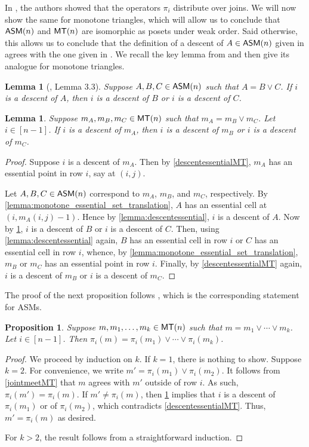\documentclass[12 pt]{amsart}
\newtheorem{proposition}[Theorem]{Proposition}
\newtheorem{lemma}[Theorem]{Lemma}
\numberwithin{equation}{section}
\theoremstyle{remark}
\newcommand{\asm}{{\sf ASM}}
\newcommand{\monotone}{{\sf MT}}
\begin{document}
In \cite{EKW-main}, the authors showed that the operators $\pi_i$ distribute over joins. We will now show the same for monotone triangles, which will allow us to conclude that $\asm(n)$ and $\monotone(n)$ are isomorphic as posets under weak order. Said otherwise, this allows us to conclude that the definition of a descent of $A \in \asm(n)$ given in \cite{EKW-main} agrees with the one given in \cite{HR20}. We recall the key lemma from \cite{EKW-main} and then give its analogue for monotone triangles.

\begin{lemma}[\cite{EKW-main}, Lemma 3.3]
\label{lemma:joindescent}
    Suppose $A,B,C\in \asm(n)$ such that $A=B\vee C$.  If $i$ is a descent of $A$, then $i$ is a descent of $B$ or $i$ is a descent of $C$.  
\end{lemma}

\begin{lemma}
\label{lemma:joindescentMT}
    Suppose $m_A,m_B,m_C\in \monotone(n)$ such that $m_A=m_B\vee m_C$.  Let $i \in [n-1]$. If $i$ is a descent of $m_A$, then $i$ is a descent of $m_B$ or $i$ is a descent of $m_C$.  
\end{lemma}
\begin{proof}
  Suppose $i$ is a descent of $m_A$.  Then by \cref{descentessentialMT}, $m_A$ has an essential point in row $i$, say at $(i,j)$. 
  
  Let $A, B, C \in \asm(n)$ correspond to $m_A$, $m_B$, and $m_C$, respectively. By \cref{lemma:monotone_essential_set_translation}, $A$ has an essential cell at $(i,m_A(i,j)-1)$. Hence by \cref{lemma:descentessential}, $i$ is a descent of $A$. Now by \cref{lemma:joindescent}, $i$ is a descent of $B$ or $i$ is a descent of $C$. Then, using \cref{lemma:descentessential} again, $B$ has an essential cell in row $i$ or $C$ has an essential cell in row $i$, whence, by \cref{lemma:monotone_essential_set_translation}, $m_B$ or $m_C$ has an essential point in row $i$. Finally, by \cref{descentessentialMT} again, $i$ is a descent of $m_B$ or $i$ is a descent of $m_C$.
\end{proof}

The proof of the next proposition follows \cite[Proposition 3.4]{EKW-main}, which is the corresponding statement for ASMs.

\begin{proposition}\label{prop:joindescentpart3MT}
    Suppose $m,m_1,\ldots,m_k\in \monotone(n)$ such that $m=m_1\vee \cdots \vee m_k$.  Let $i\in [n-1]$.  Then $\pi_i(m)=\pi_i(m_1)\vee \cdots \vee \pi_i(m_k)$.  
\end{proposition}
\begin{proof}
We proceed by induction on $k$.  If $k=1$, there is nothing to show.  Suppose $k=2$. For convenience, we write $m'=\pi_i(m_1)\vee \pi_i(m_2)$.  It follows from \cref{jointmeetMT} that $m$ agrees with $m'$ outside of row $i$.  As such, $\pi_i(m')=\pi_i(m)$.  If $m' \neq \pi_i(m)$, then \cref{lemma:joindescentMT} implies that $i$ is a descent of $\pi_i(m_1)$ or of $\pi_i(m_2)$, which contradicts \cref{descentessentialMT}.  Thus, $m'=\pi_i(m)$ as desired.

For $k>2$, the result follows from a straightforward induction.
\end{proof}
\end{document}
